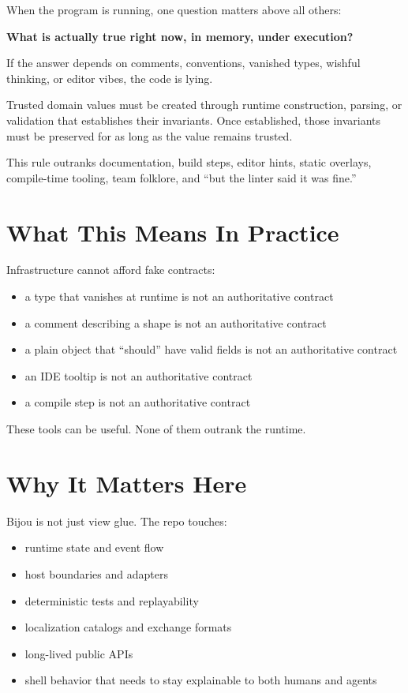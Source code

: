 When the program is running, one question matters above all others:

\textbf{What is actually true right now, in memory, under execution?}

If the answer depends on comments, conventions, vanished types, wishful thinking, or editor vibes, the code is lying.

Trusted domain values must be created through runtime construction, parsing, or validation that establishes their invariants. Once established, those invariants must be preserved for as long as the value remains trusted.

This rule outranks documentation, build steps, editor hints, static overlays, compile-time tooling, team folklore, and ``but the linter said it was fine.''

\section{What This Means In Practice}\label{record-060-what-this-means-in-practice}

Infrastructure cannot afford fake contracts:

\begin{itemize}
\tightlist
\item
  a type that vanishes at runtime is not an authoritative contract
\item
  a comment describing a shape is not an authoritative contract
\item
  a plain object that ``should'' have valid fields is not an authoritative contract
\item
  an IDE tooltip is not an authoritative contract
\item
  a compile step is not an authoritative contract
\end{itemize}

These tools can be useful. None of them outrank the runtime.

\section{Why It Matters Here}\label{record-060-why-it-matters-here}

Bijou is not just view glue. The repo touches:

\begin{itemize}
\tightlist
\item
  runtime state and event flow
\item
  host boundaries and adapters
\item
  deterministic tests and replayability
\item
  localization catalogs and exchange formats
\item
  long-lived public APIs
\item
  shell behavior that needs to stay explainable to both humans and agents
\end{itemize}

